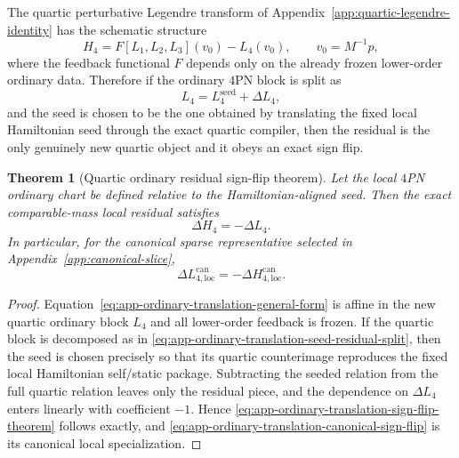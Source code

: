 \documentclass[11pt]{article}
\newtheorem{theorem}{Theorem}
\begin{document}
The quartic perturbative Legendre transform of
Appendix~\ref{app:quartic-legendre-identity} has the schematic structure
\begin{equation}
H_4 = F[L_1,L_2,L_3](v_0) - L_4(v_0),
\qquad
v_0=M^{-1}p,
\label{eq:app-ordinary-translation-general-form}
\end{equation}
where the feedback functional $F$ depends only on the already frozen lower-order
ordinary data.  Therefore if the ordinary $4$PN block is split as
\begin{equation}
L_4 = L_4^{\mathrm{seed}} + \Delta L_4,
\label{eq:app-ordinary-translation-seed-residual-split}
\end{equation}
and the seed is chosen to be the one obtained by translating the fixed local
Hamiltonian seed through the exact quartic compiler, then the residual is the
only genuinely new quartic object and it obeys an exact sign flip.

\begin{theorem}[Quartic ordinary residual sign-flip theorem]
\label{thm:app-ordinary-translation-sign-flip}
Let the local $4$PN ordinary chart be defined relative to the
Hamiltonian-aligned seed.  Then the exact comparable-mass local residual
satisfies
\begin{equation}
\boxed{
\Delta H_4 = -\Delta L_4.
}
\label{eq:app-ordinary-translation-sign-flip-theorem}
\end{equation}
In particular, for the canonical sparse representative selected in
Appendix~\ref{app:canonical-slice},
\begin{equation}
\boxed{
\Delta L_{4,\mathrm{loc}}^{\mathrm{can}}
=
-\Delta H_{4,\mathrm{loc}}^{\mathrm{can}}.
}
\label{eq:app-ordinary-translation-canonical-sign-flip}
\end{equation}
\end{theorem}

\begin{proof}
Equation~\eqref{eq:app-ordinary-translation-general-form} is affine in the new
quartic ordinary block $L_4$ and all lower-order feedback is frozen.  If the
quartic block is decomposed as in
\eqref{eq:app-ordinary-translation-seed-residual-split}, then the seed is
chosen precisely so that its quartic counterimage reproduces the fixed local
Hamiltonian self/static package.  Subtracting the seeded relation from the full
quartic relation leaves only the residual piece, and the dependence on
$\Delta L_4$ enters linearly with coefficient $-1$.  Hence
\eqref{eq:app-ordinary-translation-sign-flip-theorem} follows exactly, and
\eqref{eq:app-ordinary-translation-canonical-sign-flip} is its canonical local
specialization.
\end{proof}
\end{document}
